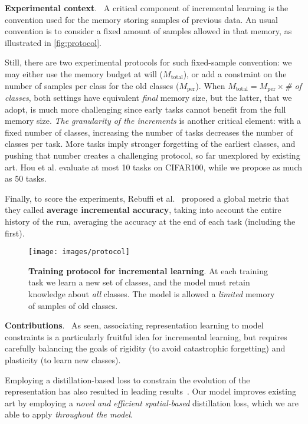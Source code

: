 \documentclass[runningheads]{llncs}
\newcommand{\parag}[1]{\vspace{0.2cm}\noindent\textbf{#1}.\ }
\begin{document}
\parag{Experimental context} A critical component of incremental learning is the convention used for the memory storing samples of previous data. An usual convention is to consider a fixed amount of samples allowed in that memory, as illustrated in \autoref{fig:protocol}.

Still, there are two experimental protocols for such fixed-sample convention: we may either use the memory budget at will ($M_\mathrm{total}$), or add a constraint on the number of samples per class for the old classes ($M_\mathrm{per}$). When $M_\mathrm{total}=M_\mathrm{per}\times$\textit{\# of classes}, both settings have equivalent \textit{final} memory size, but the latter, that we adopt, is much more challenging since early tasks cannot benefit from the full memory size.
\textit{The granularity of the increments} is another critical element: with a fixed number of classes, increasing the number of tasks decreases the number of classes per task. More tasks imply stronger forgetting of the earliest classes, and pushing that number creates a challenging protocol, so far unexplored by existing art. Hou et al. evaluate at most 10 tasks on CIFAR100, while we propose as much as 50 tasks.

Finally, to score the experiments, Rebuffi et al.~\cite{rebuffi2017icarl} proposed a global metric that they called \textbf{average incremental accuracy}, taking into account the entire history of the run, averaging the accuracy at the end of each task (including the first).


\begin{figure}[tb]
\begin{center}
    \texttt{[image: images/protocol]}
\end{center}
   \caption{\textbf{Training protocol for incremental learning}. At each training task we learn a new set of classes, and the model must retain knowledge about \textit{all} classes. The model is allowed a \textit{limited} memory of samples of old classes.}
    \label{fig:protocol}
\end{figure}

\parag{Contributions} As seen, associating representation learning to model constraints is a particularly fruitful idea for incremental learning, but requires carefully balancing the goals of rigidity (to avoid catastrophic forgetting) and plasticity (to learn new classes). 

Employing a distillation-based loss to constrain the evolution of the representation has also resulted in leading results~\cite{hou2019ucir,wu2019bias_correction,peng2019m2kd,dhar2019learning_without_memorizing_gradcam}. Our model improves existing art by employing a \textit{novel and efficient spatial-based} distillation loss, which we are able to apply \textit{throughout the model}.
\end{document}
